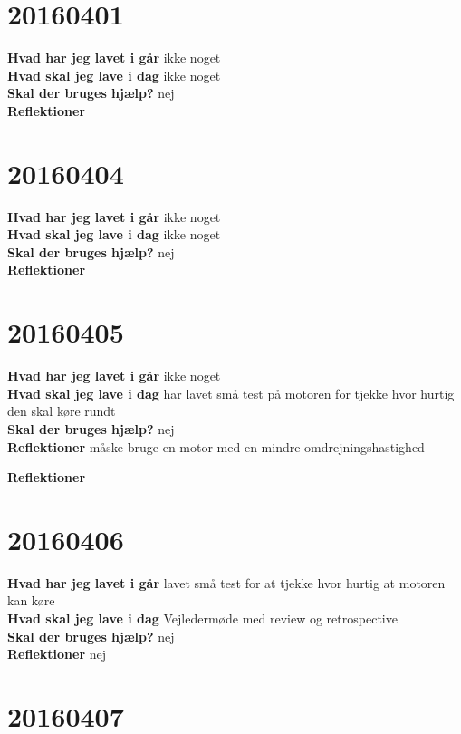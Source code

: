 \documentclass{article}
\begin{document}
				\section{20160401}
				
				\textbf{Hvad har jeg lavet i går}
				ikke noget
				\\
				\textbf{Hvad skal jeg lave i dag}
				ikke noget
				\\
				\textbf{Skal der bruges hjælp?}
				nej
				\\
				\textbf{Reflektioner}
					\section{20160404}
					
					\textbf{Hvad har jeg lavet i går}
					ikke noget
					\\
					\textbf{Hvad skal jeg lave i dag}
					ikke noget
					\\
					\textbf{Skal der bruges hjælp?}
					nej
					\\
					\textbf{Reflektioner}
						\section{20160405}
						
						\textbf{Hvad har jeg lavet i går}
						ikke noget
						\\
						\textbf{Hvad skal jeg lave i dag}
						har lavet små test på motoren for tjekke hvor hurtig den skal køre rundt
						\\
						\textbf{Skal der bruges hjælp?}
						nej
						\\
						\textbf{Reflektioner}
						måske bruge en motor med en mindre omdrejningshastighed
						
						 
						\textbf{Reflektioner}
						\section{20160406}
						
						\textbf{Hvad har jeg lavet i går}
						lavet små test for at tjekke hvor hurtig at motoren kan køre
						\\
						\textbf{Hvad skal jeg lave i dag}
						Vejledermøde med review og retrospective
						\\
						\textbf{Skal der bruges hjælp?}
						nej
						\\
						\textbf{Reflektioner}
						nej
						\section{20160407}
						
\end{document}
